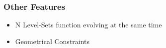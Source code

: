 
\begin{frame}
\frametitle{Other Features}
  \begin{itemize}
    \item N Level-Sets function evolving at the same time
    \item Geometrical Constraints
  \end{itemize}
\end{frame}


